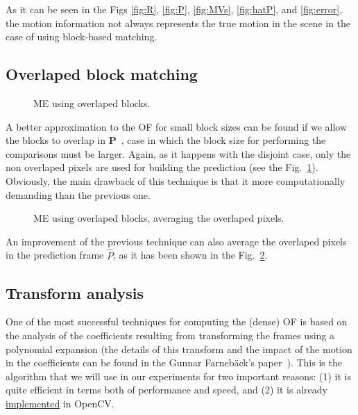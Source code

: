 As it can be seen in the Figs \ref{fig:R}, \ref{fig:P}, \ref{fig:MVs},
\ref{fig:hatP}, and \ref{fig:error}, the motion information not always
represents the true motion in the scene in the case of using
block-based matching.

\subsection{Overlaped block matching}

\begin{figure}
  \centering
  \caption{ME using overlaped blocks.}
  \label{fig:overlaped}
\end{figure}

A better approximation to the OF for small block sizes can be found if
we allow the blocks to overlap in ${\mathbf
  P}$~\cite{orchard1994overlapped}, case in which the block size for
performing the comparisons must be larger. Again, as it happens with the
disjoint case, only the non overlaped pixels are used for building the
prediction (see the Fig.~\ref{fig:overlaped}). Obviously, the main
drawback of this technique is that it more computationally demanding
than the previous one.

\begin{figure}
  \centering
  \caption{ME using overlaped blocks, averaging the overlaped pixels.}
  \label{fig:average}
\end{figure}

An improvement of the previous technique can also average the
overlaped pixels in the prediction frame $\hat{P}$, as it has been
shown in the Fig.~\ref{fig:average}.

\subsection{Transform analysis}
One of the most successful techniques for computing the (dense) OF is
based on the analysis of the coefficients resulting from transforming
the frames using a polynomial expansion (the details of this transform
and the impact of the motion in the coefficients can be found in the
Gunnar Farneb{\"a}ck's paper~\cite{farneback2003two}). This is the
algorithm that we will use in our experiments for two important
reasons: (1) it is quite efficient in terms both of performance and
speed, and (2) it is already
\href{https://docs.opencv.org/3.4/d4/dee/tutorial_optical_flow.html}{implemented}
in OpenCV.

